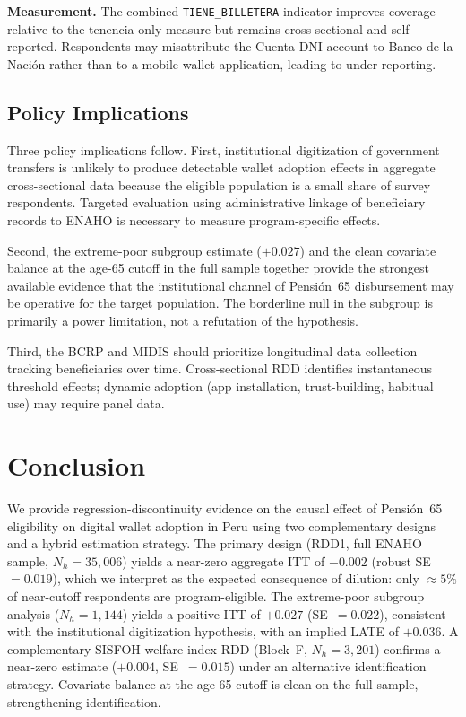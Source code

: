 \documentclass[12pt]{article}
\begin{document}
\textbf{Measurement.}
The combined \texttt{TIENE\_BILLETERA} indicator improves coverage relative
to the tenencia-only measure but remains cross-sectional and self-reported.
Respondents may misattribute the Cuenta DNI account to Banco de la Naci\'on
rather than to a mobile wallet application, leading to under-reporting.

\subsection{Policy Implications}

Three policy implications follow. First, institutional digitization of
government transfers is unlikely to produce detectable wallet adoption
effects in aggregate cross-sectional data because the eligible population
is a small share of survey respondents. Targeted evaluation using
administrative linkage of beneficiary records to ENAHO is necessary to
measure program-specific effects.

Second, the extreme-poor subgroup estimate ($+0.027$) and the clean
covariate balance at the age-65 cutoff in the full sample together provide
the strongest available evidence that the institutional channel of
Pensi\'on~65 disbursement may be operative for the target population. The
borderline null in the subgroup is primarily a power limitation, not a
refutation of the hypothesis.

Third, the BCRP and MIDIS should prioritize longitudinal data collection
tracking beneficiaries over time. Cross-sectional RDD identifies
instantaneous threshold effects; dynamic adoption (app installation,
trust-building, habitual use) may require panel data.


\section{Conclusion}
\label{sec:conclusion}

We provide regression-discontinuity evidence on the causal effect of
Pensi\'on~65 eligibility on digital wallet adoption in Peru using two
complementary designs and a hybrid estimation strategy. The primary design
(RDD1, full ENAHO sample, $N_h\!=\!35{,}006$) yields a near-zero aggregate
ITT of $-0.002$ (robust SE~$=0.019$), which we interpret as the expected
consequence of dilution: only $\approx\!5\%$ of near-cutoff respondents are
program-eligible. The extreme-poor subgroup analysis ($N_h\!=\!1{,}144$)
yields a positive ITT of $+0.027$ (SE~$=0.022$), consistent with the
institutional digitization hypothesis, with an implied LATE of $+0.036$.
A complementary SISFOH-welfare-index RDD (Block~F, $N_h\!=\!3{,}201$)
confirms a near-zero estimate ($+0.004$, SE~$=0.015$) under an alternative
identification strategy. Covariate balance at the age-65 cutoff is clean
on the full sample, strengthening identification.
\end{document}
